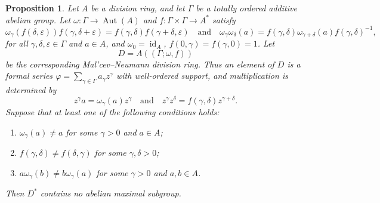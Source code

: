 \documentclass[10pt,a4paper]{amsart}
\newtheorem{proposition}{Proposition}
\begin{document}
\begin{proposition}
\label{prop:malcev-neumann}
Let $A$ be a division ring, and let $\Gamma$ be a totally ordered additive
abelian group.  Let $\omega:\Gamma\to \operatorname{Aut}(A)$ and
$f:\Gamma\times\Gamma\to A^*$ satisfy
\[
        \omega_\gamma(f(\delta,\varepsilon))f(\gamma,\delta+\varepsilon)
        =
        f(\gamma,\delta)f(\gamma+\delta,\varepsilon)
        \quad\text{and}\quad
        \omega_\gamma\omega_\delta(a)
        =
        f(\gamma,\delta)\omega_{\gamma+\delta}(a)f(\gamma,\delta)^{-1},
\]
for all $\gamma,\delta,\varepsilon\in\Gamma$ and $a\in A$, and
$\omega_0=\operatorname{id}_A$, $f(0,\gamma)=f(\gamma,0)=1$.  Let
\[
        D=A((\Gamma;\omega,f))
\]
be the corresponding Mal'cev--Neumann division ring.  Thus an element of
$D$ is a formal series $\varphi=\sum_{\gamma\in\Gamma}a_\gamma z^\gamma$ with well-ordered support, and multiplication is determined by
\[
        z^\gamma a=\omega_\gamma(a)z^\gamma\quad\text{and}\quad
        z^\gamma z^\delta=f(\gamma,\delta)z^{\gamma+\delta}.
\]
Suppose that at least one of the following conditions holds:
\begin{enumerate}[label=\textup{(\arabic*)}]
        \item $\omega_\gamma(a)\ne a$ for some $\gamma>0$ and $a\in A$;
        \item $f(\gamma,\delta)\ne f(\delta,\gamma)$ for some
        $\gamma,\delta>0$;
        \item $a\omega_\gamma(b)\ne b\omega_\gamma(a)$ for some
        $\gamma>0$ and $a,b\in A$.
\end{enumerate}
Then $D^*$ contains no abelian maximal subgroup.
\end{proposition}
\end{document}
